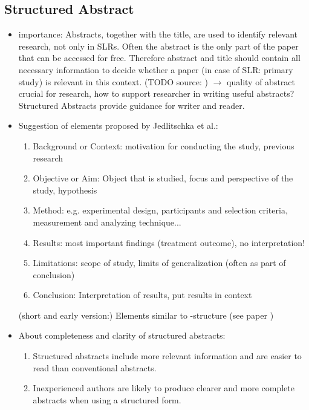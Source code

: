 \subsection{Structured Abstract}

\begin{itemize}
\item importance: Abstracts, together with the title, are used to identify relevant research, not only in SLRs. Often the abstract is the only part of the paper that can be accessed for free. Therefore abstract and title should contain all necessary information to decide whether a paper (in case of SLR: primary study) is relevant in this context. (TODO source: )
	$\rightarrow$ quality of abstract crucial for research, how to support researcher in writing useful abstracts? Structured Abstracts provide guidance for writer and reader. 
\item Suggestion of elements proposed by Jedlitschka et al.\cite{Jedlitschka2008}: 
	\begin{enumerate}
		\item Background or Context: motivation for conducting the study, previous research
		\item Objective or Aim: Object that is studied, focus and perspective of the study, hypothesis
		\item Method: e.g. experimental design, participants and selection criteria, measurement and analyzing technique...
		\item Results: most important findings (treatment outcome), no interpretation!
		\item Limitations: scope of study, limits of generalization (often as part of conclusion)
		\item Conclusion: Interpretation of results, put results in context
	\end{enumerate}
	(short and early version:\cite{Jedlitschka2005})
	\newline
	Elements similar to -structure (see paper )
\item About completeness and clarity of structured abstracts:
	\begin{enumerate}
	\item Structured abstracts include more relevant information and are easier to read than conventional abstracts. \cite{Budgen2008} \cite{Budgen2007}
	\item Inexperienced authors are likely to produce clearer and more complete abstracts when using a structured form.\cite{Budgen2011} 

\end{enumerate}
\end{itemize}
